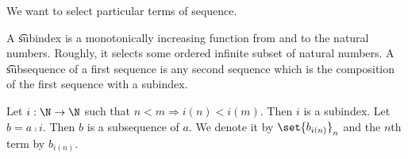 
We want to select particular terms of sequence.

A \t{subindex} is a monotonically increasing function from and to the natural numbers.
Roughly, it selects some ordered infinite subset of natural numbers.
A \t{subsequence} of a first sequence is any second sequence which is the composition of the first sequence with a subindex.


Let $i: \N  \to \N $ such that $n < m \Rightarrow i(n) < i(m)$.
Then $i$ is a subindex.
Let $b = a \comp i$.
Then $b$ is a subsequence of $a$.
We denote it by $\set{b_{i(n)}}_n$ and the $n$th term by $b_{i(n)}$.

\blankpage
